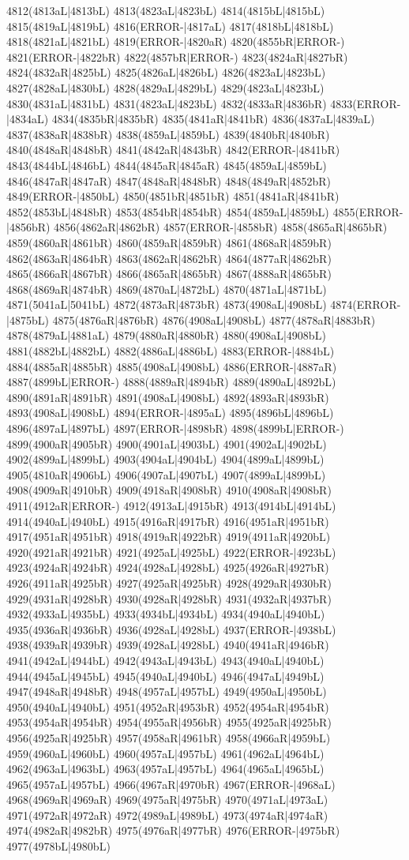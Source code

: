 4812(4813aL|4813bL) 4813(4823aL|4823bL) 4814(4815bL|4815bL) 4815(4819aL|4819bL) 4816(ERROR-|4817aL) 4817(4818bL|4818bL) 4818(4821aL|4821bL) 4819(ERROR-|4820aR) 4820(4855bR|ERROR-) 4821(ERROR-|4822bR) 4822(4857bR|ERROR-) 4823(4824aR|4827bR) 4824(4832aR|4825bL) 4825(4826aL|4826bL) 4826(4823aL|4823bL) 4827(4828aL|4830bL) 4828(4829aL|4829bL) 4829(4823aL|4823bL) 4830(4831aL|4831bL) 4831(4823aL|4823bL) 4832(4833aR|4836bR) 4833(ERROR-|4834aL) 4834(4835bR|4835bR) 4835(4841aR|4841bR) 4836(4837aL|4839aL) 4837(4838aR|4838bR) 4838(4859aL|4859bL) 4839(4840bR|4840bR) 4840(4848aR|4848bR) 4841(4842aR|4843bR) 4842(ERROR-|4841bR) 4843(4844bL|4846bL) 4844(4845aR|4845aR) 4845(4859aL|4859bL) 4846(4847aR|4847aR) 4847(4848aR|4848bR) 4848(4849aR|4852bR) 4849(ERROR-|4850bL) 4850(4851bR|4851bR) 4851(4841aR|4841bR) 4852(4853bL|4848bR) 4853(4854bR|4854bR) 4854(4859aL|4859bL) 4855(ERROR-|4856bR) 4856(4862aR|4862bR) 4857(ERROR-|4858bR) 4858(4865aR|4865bR) 4859(4860aR|4861bR) 4860(4859aR|4859bR) 4861(4868aR|4859bR) 4862(4863aR|4864bR) 4863(4862aR|4862bR) 4864(4877aR|4862bR) 4865(4866aR|4867bR) 4866(4865aR|4865bR) 4867(4888aR|4865bR) 4868(4869aR|4874bR) 4869(4870aL|4872bL) 4870(4871aL|4871bL) 4871(5041aL|5041bL) 4872(4873aR|4873bR) 4873(4908aL|4908bL) 4874(ERROR-|4875bL) 4875(4876aR|4876bR) 4876(4908aL|4908bL) 4877(4878aR|4883bR) 4878(4879aL|4881aL) 4879(4880aR|4880bR) 4880(4908aL|4908bL) 4881(4882bL|4882bL) 4882(4886aL|4886bL) 4883(ERROR-|4884bL) 4884(4885aR|4885bR) 4885(4908aL|4908bL) 4886(ERROR-|4887aR) 4887(4899bL|ERROR-) 4888(4889aR|4894bR) 4889(4890aL|4892bL) 4890(4891aR|4891bR) 4891(4908aL|4908bL) 4892(4893aR|4893bR) 4893(4908aL|4908bL) 4894(ERROR-|4895aL) 4895(4896bL|4896bL) 4896(4897aL|4897bL) 4897(ERROR-|4898bR) 4898(4899bL|ERROR-) 4899(4900aR|4905bR) 4900(4901aL|4903bL) 4901(4902aL|4902bL) 4902(4899aL|4899bL) 4903(4904aL|4904bL) 4904(4899aL|4899bL) 4905(4810aR|4906bL) 4906(4907aL|4907bL) 4907(4899aL|4899bL) 4908(4909aR|4910bR) 4909(4918aR|4908bR) 4910(4908aR|4908bR) 4911(4912aR|ERROR-) 4912(4913aL|4915bR) 4913(4914bL|4914bL) 4914(4940aL|4940bL) 4915(4916aR|4917bR) 4916(4951aR|4951bR) 4917(4951aR|4951bR) 4918(4919aR|4922bR) 4919(4911aR|4920bL) 4920(4921aR|4921bR) 4921(4925aL|4925bL) 4922(ERROR-|4923bL) 4923(4924aR|4924bR) 4924(4928aL|4928bL) 4925(4926aR|4927bR) 4926(4911aR|4925bR) 4927(4925aR|4925bR) 4928(4929aR|4930bR) 4929(4931aR|4928bR) 4930(4928aR|4928bR) 4931(4932aR|4937bR) 4932(4933aL|4935bL) 4933(4934bL|4934bL) 4934(4940aL|4940bL) 4935(4936aR|4936bR) 4936(4928aL|4928bL) 4937(ERROR-|4938bL) 4938(4939aR|4939bR) 4939(4928aL|4928bL) 4940(4941aR|4946bR) 4941(4942aL|4944bL) 4942(4943aL|4943bL) 4943(4940aL|4940bL) 4944(4945aL|4945bL) 4945(4940aL|4940bL) 4946(4947aL|4949bL) 4947(4948aR|4948bR) 4948(4957aL|4957bL) 4949(4950aL|4950bL) 4950(4940aL|4940bL) 4951(4952aR|4953bR) 4952(4954aR|4954bR) 4953(4954aR|4954bR) 4954(4955aR|4956bR) 4955(4925aR|4925bR) 4956(4925aR|4925bR) 4957(4958aR|4961bR) 4958(4966aR|4959bL) 4959(4960aL|4960bL) 4960(4957aL|4957bL) 4961(4962aL|4964bL) 4962(4963aL|4963bL) 4963(4957aL|4957bL) 4964(4965aL|4965bL) 4965(4957aL|4957bL) 4966(4967aR|4970bR) 4967(ERROR-|4968aL) 4968(4969aR|4969aR) 4969(4975aR|4975bR) 4970(4971aL|4973aL) 4971(4972aR|4972aR) 4972(4989aL|4989bL) 4973(4974aR|4974aR) 4974(4982aR|4982bR) 4975(4976aR|4977bR) 4976(ERROR-|4975bR) 4977(4978bL|4980bL) 